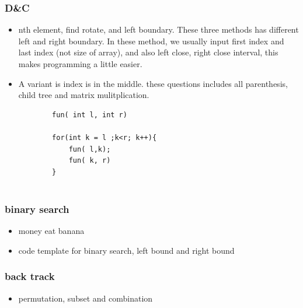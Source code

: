 \documentclass[a4paper,11pt,twoside]{book}
\begin{document}
\subsubsection{D\&C}
\begin{itemize}
	\item nth element, find rotate, and left boundary. These three methods has different left and right boundary.  In these method, we usually input first index and last index (not size of array), and also left close, right close interval, this makes programming a little easier. 
	
	\item A variant is index is in the middle. these questions includes all parenthesis, child tree and matrix mulitplication.
	\begin{lstlisting}
		fun( int l, int r)
		
		for(int k = l ;k<r; k++){
			fun( l,k);
			fun( k, r)
		}	
		
	\end{lstlisting}
\end{itemize}


\subsubsection{binary search}
\begin{itemize}
	\item money eat banana 
	\item code template for binary search, left bound and right bound
\end{itemize}

\subsubsection{back track}
\begin{itemize}
	\item permutation, subset and combination 
\end{itemize}
\end{document}
